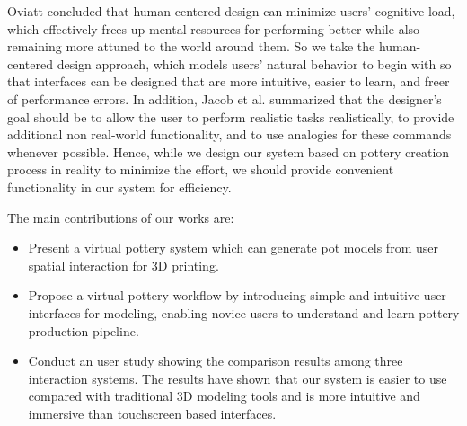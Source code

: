 Oviatt \cite{oviatt2006human} concluded that human-centered design can minimize users’ cognitive load, which effectively frees up mental resources for performing better while also remaining more attuned to the world around them.
So we take the human-centered design approach, which models users’ natural behavior to begin with so that interfaces can be designed that are more intuitive, easier to learn, and freer of performance errors.
In addition, Jacob et al. \cite{Jacob2008Reality} summarized that the designer's goal should be to allow the user to perform realistic tasks realistically, to provide additional non real-world functionality, and to use analogies for these commands whenever possible.
Hence, while we design our system based on pottery creation process in reality to minimize the effort, we should provide convenient functionality in our system for efficiency.

The main contributions of our works are:

\begin{itemize}
\item Present a virtual pottery system which can generate pot models from user spatial interaction for 3D printing.
\item Propose a virtual pottery workflow by introducing simple and intuitive user interfaces for modeling, enabling novice users to understand and learn pottery production pipeline.
\item Conduct an user study showing the comparison results among three interaction systems. The results have shown that our system is easier to use compared with traditional 3D modeling tools and is more intuitive and immersive than touchscreen based interfaces.
\end{itemize}

